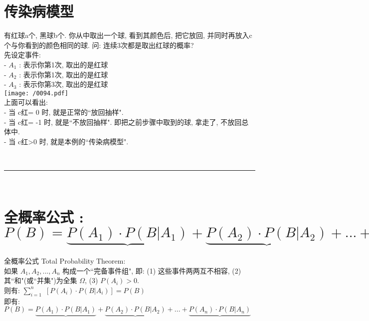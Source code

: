 \documentclass[UTF8]{ctexart}
\begin{document}
\section{传染病模型}


\begin{myEnvSample}
	有红球a个, 黑球b个. 你从中取出一个球, 看到其颜色后, 把它放回, 并同时再放入c个与你看到的颜色相同的球. 	问:  连续3次都是取出红球的概率? \\
	先设定事件: \\
	- $A_1$ : 表示你第1次, 取出的是红球 \\
	- $A_2$ : 表示你第1次, 取出的是红球 \\	
	- $A_3$ : 表示你第3次, 取出的是红球 \\	
	
	\texttt{[image: /0094.pdf]} \\
	
	上面可以看出: \\
	- 当 c红= 0 时, 就是正常的``放回抽样". \\
	- 当 c红= -1 时, 就是``不放回抽样". 即把之前步骤中取到的球, 拿走了, 不放回总体中. \\
	- 当 c红>0 时, 就是本例的``传染病模型".	
\end{myEnvSample}



~\\
\hrule
~\\

	
	\section{全概率公式 : $
		P\left( B \right) =\underbrace{P\left( A_1 \right) \cdot P\left( B|A_1 \right) }+\underbrace{P\left( A_2 \right) \cdot P\left( B|A_2 \right) }+...+\underbrace{P\left( A_n \right) \cdot P\left( B|A_n \right) }
		$}
	
	全概率公式 Total Probability Theorem: \\	
	如果 $A_1, A_2, ..., A_n$ 构成一个``完备事件组", 即: (1) 这些事件两两互不相容,  (2)其``和"(或``并集")为全集 $\Omega$, (3) $P(A_i)>0$. \\
		
	则有:
$\boxed{
\sum_{i=1}^n{\,\,\left[ P\left( A_i \right) \cdot P\left( B|A_i \right) \right]}=P\left( B \right) 
}
$ \\


即有: $
P\left( B \right) =\underbrace{P\left( A_1 \right) \cdot P\left( B|A_1 \right) }+\underbrace{P\left( A_2 \right) \cdot P\left( B|A_2 \right) }+...+\underbrace{P\left( A_n \right) \cdot P\left( B|A_n \right) }
$ \\
\end{document}

